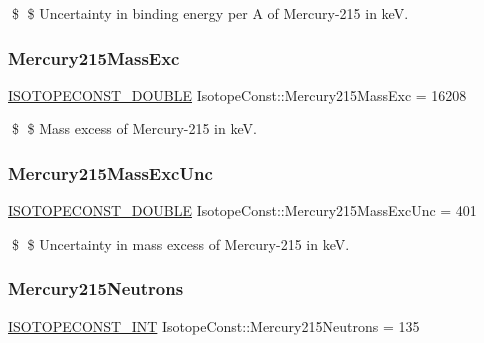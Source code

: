 \$ \$ Uncertainty in binding energy per A of Mercury-\/215 in keV. \mbox{\label{group___isotope_const-_mercury-_hg215_gad878facf39df00d0f4e526b1cd2d6d04}} 
\subsubsection{\texorpdfstring{Mercury215\+Mass\+Exc}{Mercury215MassExc}}
{\footnotesize\ttfamily \mbox{\hyperlink{group___isotope_const-_macros_ga8f45a7272ce02c0b4c65c44636ed719a}{I\+S\+O\+T\+O\+P\+E\+C\+O\+N\+S\+T\+\_\+\+D\+O\+U\+B\+LE}} Isotope\+Const\+::\+Mercury215\+Mass\+Exc = 16208}

\$ \$ Mass excess of Mercury-\/215 in keV. \mbox{\label{group___isotope_const-_mercury-_hg215_gac803d27041f4ce44dfaf76f77b759b67}} 
\subsubsection{\texorpdfstring{Mercury215\+Mass\+Exc\+Unc}{Mercury215MassExcUnc}}
{\footnotesize\ttfamily \mbox{\hyperlink{group___isotope_const-_macros_ga8f45a7272ce02c0b4c65c44636ed719a}{I\+S\+O\+T\+O\+P\+E\+C\+O\+N\+S\+T\+\_\+\+D\+O\+U\+B\+LE}} Isotope\+Const\+::\+Mercury215\+Mass\+Exc\+Unc = 401}

\$ \$ Uncertainty in mass excess of Mercury-\/215 in keV. \mbox{\label{group___isotope_const-_mercury-_hg215_gafff187bb2ad4cb3a5b1dccafa07887c3}} 
\subsubsection{\texorpdfstring{Mercury215\+Neutrons}{Mercury215Neutrons}}
{\footnotesize\ttfamily \mbox{\hyperlink{group___isotope_const-_macros_ga5f18360b3e99483a35c32d789e62621c}{I\+S\+O\+T\+O\+P\+E\+C\+O\+N\+S\+T\+\_\+\+I\+NT}} Isotope\+Const\+::\+Mercury215\+Neutrons = 135}

